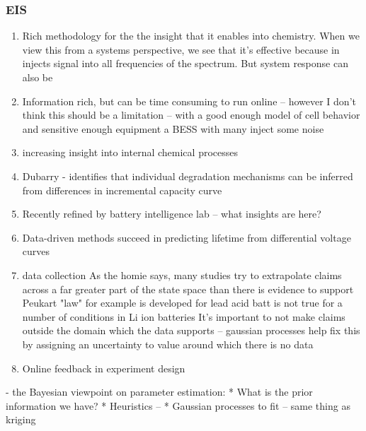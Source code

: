  \subsubsection{EIS}
\begin{enumerate}
    \item Rich methodology for the the insight that it enables into chemistry. When we view this from a systems perspective, we see that it's effective because in injects signal into all frequencies of the spectrum. But system response can also be 
    \item Information rich, but can be time consuming to run online -- however I don't think this should be a limitation -- with a good enough model of cell behavior and sensitive enough equipment a BESS with many inject some noise
    \item increasing insight into internal chemical processes
    \item Dubarry - identifies that individual degradation mechanisms can be inferred from differences in incremental capacity curve
    \item Recently refined by battery intelligence lab -- what insights are here?
    \item Data-driven methods succeed in predicting lifetime from differential voltage curves
    \item data collection 
        \subitem As the homie says, many studies try to extrapolate claims across a far greater part of the state space than there is evidence to support
        \subitem Peukart "law" for example is developed for lead acid batt is not true for a number of conditions in Li ion batteries
        \subitem It's important to not make claims outside the domain which the data supports -- gaussian processes help fix this by assigning an uncertainty to value around which there is no data
    \item Online feedback in experiment design
\end{enumerate}


- the Bayesian viewpoint on parameter estimation:
  * What is the prior information we have?
  * Heuristics -- 
  * Gaussian processes to fit -- same thing as kriging 

